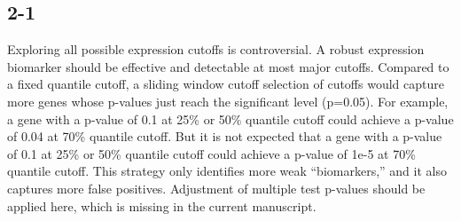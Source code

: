 \documentclass[preprint,12pt]{elsarticle}
\begin{document}
\subsection*{2-1}%
Exploring all possible expression cutoffs is controversial. 
A robust expression biomarker should be effective and detectable at most major cutoffs. Compared to a fixed quantile cutoff, a sliding window cutoff selection of cutoffs would capture more genes whose p-values just reach the significant level (p=0.05). 
For example, a gene with a p-value of 0.1 at 25\% or 50\% quantile cutoff could achieve a p-value of 0.04 at 70\% quantile cutoff. %
But it is not expected that a gene with a p-value of 0.1 at 25\% or 50\% quantile cutoff could achieve a p-value of 1e-5 at 70\% quantile cutoff. %
This strategy only identifies more weak “biomarkers,” and it also captures more false positives. %
Adjustment of multiple test p-values should be applied here, which is missing in the current manuscript.
\end{document}
